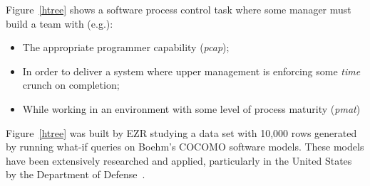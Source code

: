 \documentclass[AMA,STIX2COL]{WileyNJDv5}
\begin{document}
{Figure~\ref{htree} shows a software process control task where some manager must 
build a team with (e.g.):
\begin{itemize}
\item
The appropriate programmer capability ({\em pcap});
\item
In order to deliver a system where upper management
is enforcing some   {\em time} crunch on  completion;
\item
While working
in an environment with some level of process maturity ({\em  pmat})
\end{itemize}
Figure~\ref{htree} was built by EZR studying  a data set with 10,000 rows
generated by running what-if queries
on Boehm's COCOMO software models. These models have been extensively
researched and applied, particularly in the United States by the
Department of Defense~\cite{Boehm,boehm2000cost,Boehm:2006,cocomo}.

}
\end{document}
